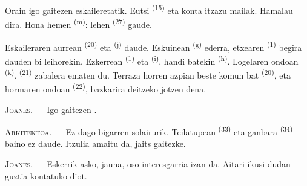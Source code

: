Orain igo gaitezen eskaileretatik. Eutsi 
\textsuperscript{(15)} eta konta itzazu mailak. Hamalau dira. Hona hemen
 \textsuperscript{(m)}: lehen 
\textsuperscript{(27)} gaude.

\VUsaut{3.0mm}
\VUsaut{3.0mm}

Eskaileraren aurrean  \textsuperscript{(20)} eta
 \textsuperscript{(j)} daude. Eskuinean 
\textsuperscript{(g)} ederra, etxearen 
\textsuperscript{(1)} begira dauden bi leihorekin. Ezkerrean 
\textsuperscript{(1)} eta  \textsuperscript{(i)},
 handi batekin \textsuperscript{(h)}. Logelaren ondoan
 \textsuperscript{(k)}. 
\textsuperscript{(21)} zabalera ematen du. Terraza horren azpian beste komun bat
\textsuperscript{(20)}, eta hormaren ondoan 
\textsuperscript{(22)}, bazkarira deitzeko jotzen dena.

\textsc{Joanes}. --- Igo gaitezen .

\textsc{Arkitektoa}. --- Ez dago bigarren solairurik. Teilatupean
 \textsuperscript{(33)} eta ganbara \textsuperscript{(34)}
baino ez daude. Itzulia amaitu da, jaits gaitezke.

\textsc{Joanes}. --- Eskerrik asko, jauna, oso interesgarria izan da. Aitari
ikusi dudan guztia kontatuko diot.
\VUsaut{4.0mm}
\VUfilet{22mm}
